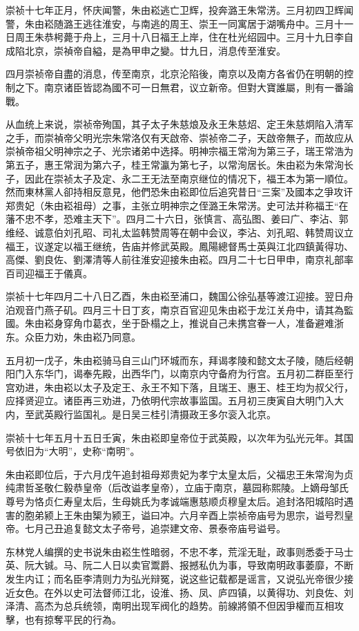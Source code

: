 崇祯十七年正月，怀庆闻警，朱由崧逃亡卫辉，投奔潞王朱常淓。三月初四卫辉闻警，朱由崧随潞王逃往淮安，与南逃的周王、崇王一同寓居于湖嘴舟中。三月十一日周王朱恭枵薨于舟上，三月十八日福王上岸，住在杜光绍园中。三月十九日李自成陷北京，崇禎帝自縊，是為甲申之變。廿九日，消息传至淮安。

四月崇祯帝自盡的消息，传至南京，北京沦陷後，南京以及南方各省仍在明朝的控制之下。南京诸臣皆認為國不可一日無君，议立新帝。但對大寶誰屬，則有一番論戰。

从血统上来说，崇祯帝殉国，其子太子朱慈烺及永王朱慈炤、定王朱慈炯陷入清军之手，而崇禎帝父明光宗朱常洛仅有天啟帝、崇祯帝二子，天啟帝無子，而故应从崇禎帝祖父明神宗之子、光宗诸弟中选择。明神宗福王常洵为第三子，瑞王常浩为第五子，惠王常润为第六子，桂王常瀛为第七子，以常洵居长。朱由崧为朱常洵长子，因此在崇祯太子及定、永二王无法至南京继位的情况下，福王本为第一順位。然而東林黨人卻持相反意見，他們恐朱由崧即位后追究昔日“三案”及國本之爭攻讦郑贵妃（朱由崧祖母）之事，主张立明神宗之侄潞王朱常淓。史可法并称福王“在藩不忠不孝，恐难主天下”。四月二十六日，张慎言、高弘图、姜曰广、李沾、郭维经、诚意伯刘孔昭、司礼太监韩赞周等在朝中会议，李沾、刘孔昭、韩赞周议立福王，议遂定以福王继统，告庙并修武英殿。鳳陽總督馬士英與江北四鎮黃得功、高傑、劉良佐、劉澤清等人前往淮安迎接朱由崧。四月二十七日甲申，南京礼部率百司迎福王于儀真。

崇祯十七年四月二十八日乙酉，朱由崧至浦口，魏国公徐弘基等渡江迎接。翌日舟泊观音门燕子矶。四月三十日丁亥，南京百官迎见朱由崧于龙江关舟中，请其為監國。朱由崧身穿角巾葛衣，坐于卧榻之上，推说自己未携宫眷一人，准备避难浙东。众臣力劝，朱由崧乃同意。

五月初一戊子，朱由崧骑马自三山门环城而东，拜谒孝陵和懿文太子陵，随后经朝阳门入东华门，谒奉先殿，出西华门，以南京内守备府为行宫。五月初二群臣至行宫劝进，朱由崧以太子及定王、永王不知下落，且瑞王、惠王、桂王均为叔父行，应择贤迎立。诸臣再三劝进，乃依明代宗故事监国。五月初三庚寅自大明门入大内，至武英殿行监国礼。是日吴三桂引清摄政王多尔衮入北京。

崇祯十七年五月十五日壬寅，朱由崧即皇帝位于武英殿，以次年为弘光元年。其国号依旧为“大明”，史称“南明”。

朱由崧即位后，于六月戊午追封祖母郑贵妃为孝宁太皇太后，父福忠王朱常洵为贞纯肃哲圣敬仁毅恭皇帝（后改谥孝皇帝），立庙于南京，墓园称熙陵。上嫡母邹氏尊号为恪贞仁寿皇太后，生母姚氏为孝诚端惠慈顺贞穆皇太后。追封洛阳城陷时遇害的胞弟颍上王朱由榘为颍王，谥曰冲。六月辛酉上崇祯帝庙号为思宗，谥号烈皇帝。七月己丑追复懿文太子帝号，追崇建文帝、景泰帝庙号谥号。

东林党人编撰的史书说朱由崧生性暗弱，不忠不孝，荒淫无耻，政事则悉委于马士英、阮大铖。马、阮二人日以卖官鬻爵、报撼私仇为事，导致南明政事萎靡，不断发生内讧；而名臣李清则力为弘光辩冤，说这些记载都是谣言，又说弘光帝很少接近女色。在外以史可法督师江北，设淮、扬、凤、庐四镇，以黄得功、刘良佐、刘泽清、高杰为总兵统领，南明出现军阀化的趋势。前線將領不但因爭權而互相攻擊，也有掠奪平民的行為。

